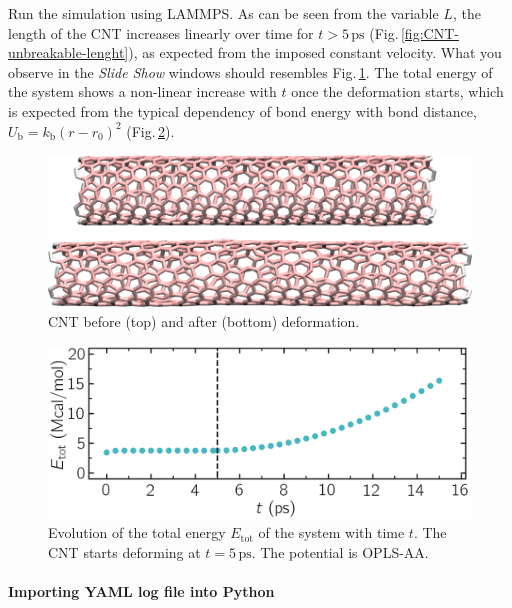 \documentclass[9pt,tutorial]{livecoms}
\begin{document}
Run the simulation using LAMMPS. As can be seen from the variable $L$, the length
of the CNT increases linearly over time for $t > 5\,\text{ps}$ (Fig.\,\ref{fig:CNT-unbreakable-lenght}),
as expected from the imposed constant velocity. What you observe in the \textit{Slide Show}
windows should resembles Fig.\,\ref{fig:CNT-deformed-unbreakable}. The total energy of the system
shows a non-linear increase with $t$ once the deformation starts, which is expected
from the typical dependency of bond energy with bond distance,
$U_\text{b} = k_\text{b} \left( r - r_0 \right)^2$ (Fig.\,\ref{fig:CNT-unbreakable-energy}).

\begin{figure}
\centering
\includegraphics[width=\linewidth]{CNT-deformed-unbreakable}
\caption{CNT before (top) and after (bottom) deformation.}
\label{fig:CNT-deformed-unbreakable}
\end{figure}

\begin{figure}
\centering
\includegraphics[width=\linewidth]{CNT-energy-unbreakable}
\caption{Evolution of the total energy $E_\text{tot}$ of the system with time $t$.
The CNT starts deforming at $t = 5\,\text{ps}$. The potential is OPLS-AA.}
\label{fig:CNT-unbreakable-energy}
\end{figure}

\paragraph{Importing YAML log file into Python}
\end{document}

